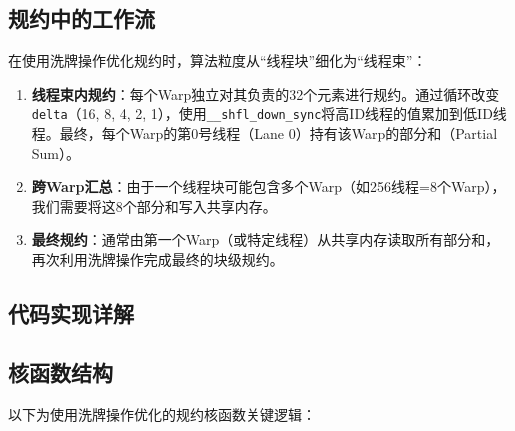 \subsection{规约中的工作流}
在使用洗牌操作优化规约时，算法粒度从“线程块”细化为“线程束”：
\begin{enumerate}
    \item \textbf{线程束内规约}：每个Warp独立对其负责的32个元素进行规约。通过循环改变\texttt{delta}（16, 8, 4, 2, 1），使用\texttt{\_\_shfl\_down\_sync}将高ID线程的值累加到低ID线程。最终，每个Warp的第0号线程（Lane 0）持有该Warp的部分和（Partial Sum）。
    \item \textbf{跨Warp汇总}：由于一个线程块可能包含多个Warp（如256线程=8个Warp），我们需要将这8个部分和写入共享内存。
    \item \textbf{最终规约}：通常由第一个Warp（或特定线程）从共享内存读取所有部分和，再次利用洗牌操作完成最终的块级规约。
\end{enumerate}

\subsection{代码实现详解}

\subsection{核函数结构}
以下为使用洗牌操作优化的规约核函数关键逻辑：

